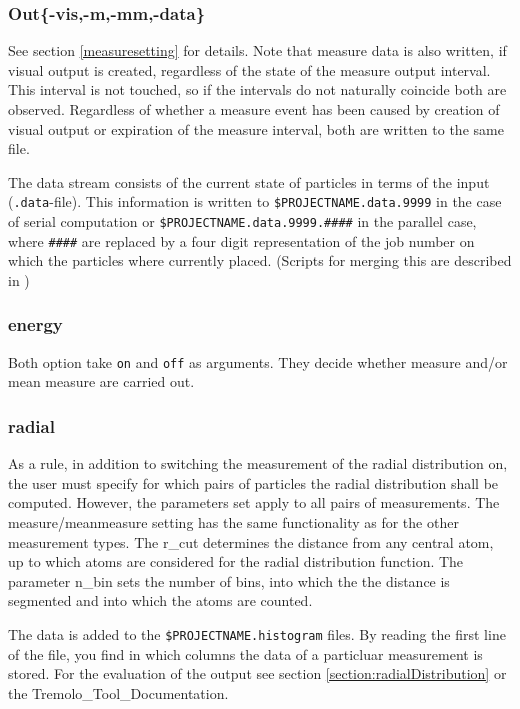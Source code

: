 \subsubsection{Out\{-vis,-m,-mm,-data\}}
See section \ref{measuresetting} for details. Note that measure data is also written, if visual output is created, regardless of the state of the measure output interval. This interval is not touched, so if the intervals do not naturally coincide both are observed. Regardless of whether a measure event has been caused by creation of visual output or expiration of the measure interval, both are written to the same file.

The data stream consists of the current state of particles in terms of the input ({\tt .data}-file). This information is written to {\tt \$PROJECTNAME.data.9999} in the case of serial computation or {\tt \$PROJECTNAME.data.9999.\#\#\#\#} in the parallel case, where {\tt \#\#\#\#} are replaced by a four digit representation of the job number on which the particles where currently placed. (Scripts for merging this are described in )
\subsubsection{energy}
Both option take {\tt on} and {\tt off} as arguments. They decide whether measure and/or mean measure are carried out.
\subsubsection{radial}
As a rule, in addition to switching the measurement of the radial distribution on, the user must specify for which pairs of particles the radial distribution shall be computed.
However, the parameters set apply to all pairs of measurements. The measure/meanmeasure setting has the same functionality as for the other measurement types.
The r\_cut determines the distance from any central atom, up to which atoms are considered for the radial distribution function. The parameter n\_bin sets the number of bins, into which the the distance is segmented and into
which the atoms are counted.

The data is added to the \texttt{\$PROJECTNAME.histogram} files. By reading
the first line of the file, you find in which columns the data of a particluar
measurement is stored.
For the evaluation of the output see section \ref{section:radialDistribution} or the Tremolo\_Tool\_Documentation.

